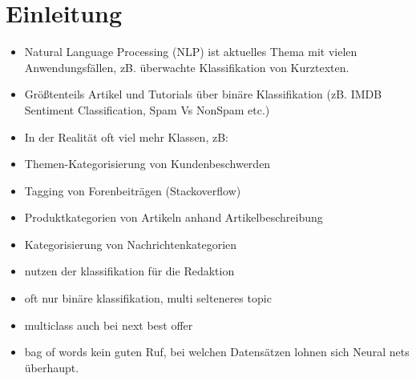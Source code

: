 \documentclass[a4paper,11pt]{article}
\begin{document}
\begin{titlepage}
\begin{acronym}[XGBoost]
\end{acronym}

\newpage

\end{titlepage}









\section{Einleitung}

\begin{itemize}
\item Natural Language Processing (NLP) ist aktuelles Thema mit vielen Anwendungsfällen, zB. überwachte Klassifikation von Kurztexten.
   \item Größtenteils Artikel und Tutorials über binäre Klassifikation (zB. IMDB Sentiment Classification, Spam Vs NonSpam etc.)
   \item In der Realität oft viel mehr Klassen, zB:
   \item Themen-Kategorisierung von Kundenbeschwerden
   \item Tagging von Forenbeiträgen (Stackoverflow)
   \item Produktkategorien von Artikeln anhand Artikelbeschreibung
   \item Kategorisierung von Nachrichtenkategorien
    \item nutzen der klassifikation für die Redaktion
    \item oft nur binäre klassifikation, multi selteneres topic
    \item multiclass auch bei next best offer
    \item bag of words kein guten Ruf, bei welchen Datensätzen lohnen sich Neural nets überhaupt.
\end{itemize}{}
\end{document}

